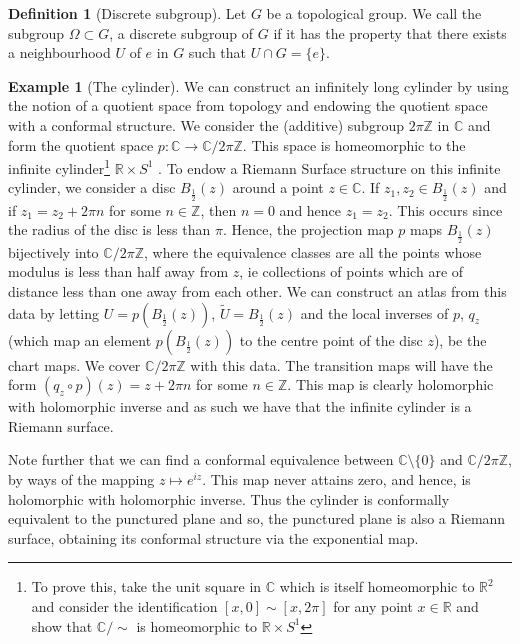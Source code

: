 \documentclass[11pt]{report}
\theoremstyle{definition}
\newtheorem{defn}[thm]{Definition}
\newtheorem*{example*}{Example}
\begin{document}
\begin{defn}[Discrete subgroup]
  Let $G$ be a topological group. We call the subgroup $\Omega \subset G$, a discrete subgroup of $G$ if it has the property that there exists a neighbourhood $U$ of $e$ in $G$ such that $U \cap G = \{e\}$.
\end{defn}
\begin{example*}[The cylinder]
We can construct an infinitely long cylinder by using the notion of a quotient space from topology and endowing the quotient space with a conformal structure. We consider the (additive) subgroup $2\pi \mathbb{Z}$ in $\mathbb{C}$ and form the quotient space $p \colon \mathbb{C} \rightarrow \mathbb{C}/2\pi \mathbb{Z}$. This space is homeomorphic to the infinite cylinder\footnote{To prove this, take the unit square in $\mathbb{C}$ which is itself homeomorphic to $\mathbb{R}^2$ and consider the identification $[x,0] \sim [x,2\pi]$ for any point $x \in \mathbb{R}$ and show that $\mathbb{C}/\sim$ is homeomorphic to $\mathbb{R}\times S^1$} $\mathbb{R} \times S^1$ . To endow a Riemann Surface structure on this infinite cylinder, we consider a disc $B_{\frac{1}{2}}(z)$ around a point $z \in \mathbb{C}$. If $z_1, z_2 \in B_{\frac{1}{2}}(z)$ and if $z_1 = z_2 + 2\pi n$ for some $n \in \mathbb{Z}$, then $n=0$ and hence $z_1=z_2$. This occurs since the radius of the disc is less than $\pi$. Hence, the projection map $p$ maps $B_{\frac{1}{2}}(z)$ bijectively into $\mathbb{C}/2\pi\mathbb{Z}$, where the equivalence classes are all the points whose modulus is less than half away from $z$, ie collections of points which are of distance less than one away from each other. We can construct an atlas from this data by letting $U = p(B_{\frac{1}{2}}(z))$, $\tilde{U} = B_{\frac{1}{2}}(z)$ and the local inverses of $p$, $q_z$ (which map an element $p(B_{\frac{1}{2}}(z))$ to the centre point of the disc $z$), be the chart maps. We cover $\mathbb{C}/2\pi\mathbb{Z}$ with this data. The transition maps will have the form $(q_z \circ p)(z) = z + 2\pi n$ for some $n \in \mathbb{Z}$. This map is clearly holomorphic with holomorphic inverse and as such we have that the infinite cylinder is a Riemann surface. 

Note further that we can find a conformal equivalence between $\mathbb{C}\setminus \{0\}$ and $\mathbb{C}/2\pi\mathbb{Z}$, by ways of the mapping $z \mapsto e^{iz}$. This map never attains zero, and hence, is holomorphic with holomorphic inverse. Thus the cylinder is conformally equivalent to the punctured plane and so, the punctured plane is also a Riemann surface, obtaining its conformal structure via the exponential map. 
\end{example*}
 
\end{document}
